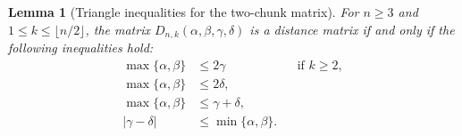 \documentclass[11pt]{amsart}
\numberwithin{equation}{section}
\newtheorem{lemma}[theorem]{Lemma}
\theoremstyle{definition}
\theoremstyle{remark}
\begin{document}
\begin{lemma}[Triangle inequalities for the two-chunk matrix]\label{lem:metric-conditions}
For \(n\geq 3\) and \(1\leq k\leq \lfloor n/2\rfloor\), the matrix \(D_{n,k}(\alpha,\beta,\gamma,\delta)\) is a distance matrix if and only if the following inequalities hold:
\begin{align}
\max\{\alpha,\beta\}&\leq 2\gamma &&\text{if } k\geq 2,
\label{eq:metric-condition-gamma-gamma}\\
\max\{\alpha,\beta\}&\leq 2\delta,
\label{eq:metric-condition-delta-delta}\\
\max\{\alpha,\beta\}&\leq \gamma+\delta,
\label{eq:metric-condition-mixed-sum}\\
|\gamma-\delta|&\leq \min\{\alpha,\beta\}.
\label{eq:metric-condition-mixed-difference}
\end{align}
\end{lemma}
\end{document}
